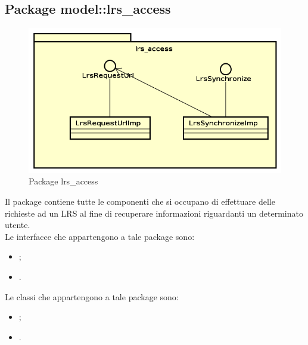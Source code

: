 \documentclass[../Tesi.tex]{subfiles}
\begin{document}
	\subsection{Package model::lrs\_access}
		\begin{figure}[H]
			\centering
			\includegraphics[scale=0.6]{images/package_diagrams/lrs_access}
				\caption{Package lrs\_access}
		\end{figure}
		Il package  contiene tutte le componenti che si occupano di effettuare delle richieste ad un LRS al fine di recuperare informazioni riguardanti un determinato utente. \\
		Le interfacce che appartengono a tale package sono:
		\begin{itemize}
			\item {};
			\item {}.
		\end{itemize}
		Le classi che appartengono a tale package sono:
		\begin{itemize}
			\item {};
			\item {}.
		\end{itemize}
\end{document}
